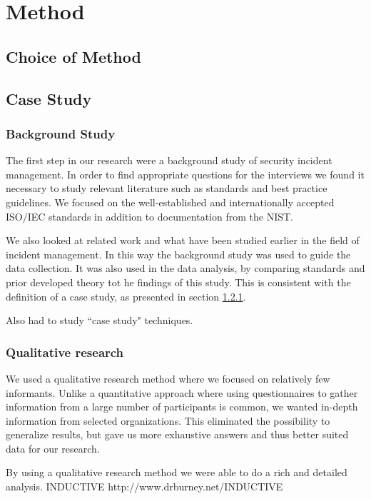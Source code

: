 \chapter{Method}
\section{Choice of Method}


\section{Case Study}


\subsection{Background Study}
\label{sec:caseStudy}
\label{sec:background}
The first step in our research were a background study of security incident management. In order to find appropriate questions for the interviews we found it necessary to study relevant literature such as standards and best practice guidelines. We focused on the well-established and internationally accepted ISO/IEC standards in addition to documentation from the \ac{NIST}.

We also looked at related work and what have been studied earlier in the field of incident management. In this way the background study was used to guide the data collection. It was also used in the data analysis, by comparing standards and prior developed theory tot he findings of this study. This is consistent with the definition of a case study, as presented in section \ref{sec:caseStudy}.

Also had to study ``case study" techniques.

\subsection{Qualitative research}
We used a qualitative research method where we focused on relatively few informants. Unlike a quantitative approach where using questionnaires to gather information from a large number of participants is common, we wanted in-depth information from selected organizations. This eliminated the possibility to generalize results, but gave us more exhaustive answers and thus better suited data for our research.

By using a qualitative research method we were able to do a rich and detailed analysis. INDUCTIVE http://www.drburney.net/INDUCTIVE%

